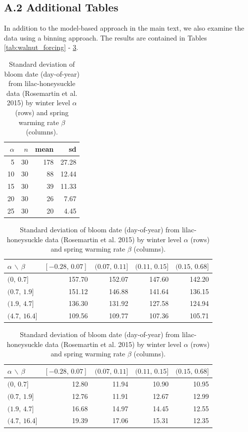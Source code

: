 \documentclass[
]{article}
\begin{document}
\subsection{A.2 Additional Tables}\label{a.2-additional-tables}

In addition to the model-based approach in the main text, we also examine the data using a binning approach. 
The results are contained in Tables  \ref{tab:walnut_forcing} - \ref{tab:sd_bloom_bins}.

\begin{table}[t]
\centering
\caption{Summary data from the Walnut forcing experiment (Charrier et al. 2011).}
\label{tab:walnut_forcing}
\begin{tabular}{rrrr}
\toprule
$\alpha$ & $n$ & mean & sd \\
\midrule
 5  & 30 & 178 & 27.28  \\
10  & 30 &  88 & 12.44  \\
15  & 30 &  39 & 11.33  \\
20  & 30 &  26 &  7.67  \\
25  & 30 &  20 &  4.45  \\
\bottomrule
\end{tabular}

\vspace{2em}

\centering
\caption{Mean bloom date (day-of-year) from lilac-honeysuckle data (Rosemartin et al. 2015) by average Jan-Feb temperature $\alpha$ (rows) and average Mar-Apr temperature increase $\beta$ (columns).}
\label{tab:mean_bloom_bins}
\begin{tabular}{lrrrr}
\toprule
$\alpha$ $\backslash$ $\beta$
& $[-0.28,\,0.07]$ & $(0.07,\,0.11]$ & $(0.11,\,0.15]$ & $(0.15,\,0.68]$ \\
\midrule
$(0,\,0.7]$     & 157.70 & 152.07 & 147.60 & 142.20 \\
$(0.7,\,1.9]$   & 151.12 & 146.88 & 141.64 & 136.15 \\
$(1.9,\,4.7]$     & 136.30 & 131.92 & 127.58 & 124.94 \\
$(4.7,\,16.4]$    & 109.56 & 109.77 & 107.36 & 105.71 \\
\bottomrule
\end{tabular}

\vspace{2em}

\centering
\caption{Standard deviation of bloom date (day-of-year) from lilac-honeysuckle data (Rosemartin et al. 2015) by winter level $\alpha$ (rows) and spring warming rate $\beta$ (columns).}
\label{tab:sd_bloom_bins}
\begin{tabular}{lrrrr}
\toprule
$\alpha$ $\backslash$ $\beta$
& $[-0.28,\,0.07]$ & $(0.07,\,0.11]$ & $(0.11,\,0.15]$ & $(0.15,\,0.68]$ \\
\midrule
$(0,\,0.7]$     & 12.80 & 11.94 & 10.90 &  10.95 \\
$(0.7,\,1.9]$   & 12.76 & 11.91 & 12.67 & 12.99 \\
$(1.9,\,4.7]$     & 16.68 & 14.97 & 14.45 & 12.55 \\
$(4.7,\,16.4]$    & 19.39 & 17.06 & 15.31 & 12.35 \\
\bottomrule
\end{tabular}
\end{table}
\end{document}
